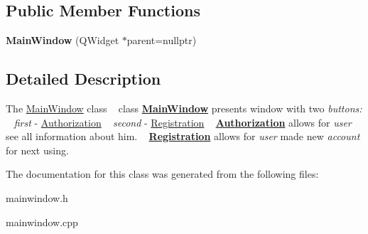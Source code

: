 \subsection*{Public Member Functions}
\begin{DoxyCompactItemize}
\item 
\mbox{\label{class_main_window_a996c5a2b6f77944776856f08ec30858d}} 
{\bfseries Main\+Window} (Q\+Widget $\ast$parent=nullptr)
\end{DoxyCompactItemize}


\subsection{Detailed Description}
The \mbox{\hyperlink{class_main_window}{Main\+Window}} class ~\newline
class {\bfseries{\mbox{\hyperlink{class_main_window}{Main\+Window}}}} presents window with two {\itshape buttons\+:} ~\newline
{\itshape first} -\/ \mbox{\hyperlink{class_authorization}{Authorization}} ~\newline
{\itshape second} -\/ \mbox{\hyperlink{class_registration}{Registration}} ~\newline
{\bfseries{\mbox{\hyperlink{class_authorization}{Authorization}}}} allows for {\itshape user} see all information about him. ~\newline
{\bfseries{\mbox{\hyperlink{class_registration}{Registration}}}} allows for {\itshape user} made new {\itshape account} for next using. 

The documentation for this class was generated from the following files\+:\begin{DoxyCompactItemize}
\item 
mainwindow.\+h\item 
mainwindow.\+cpp\end{DoxyCompactItemize}
